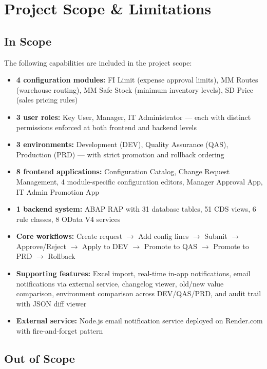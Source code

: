 \documentclass[12pt,a4paper]{report}
\begin{document}
\section{Project Scope \& Limitations}

\subsection{In Scope}

The following capabilities are included in the project scope:

\begin{itemize}[leftmargin=2em]
  \item \textbf{4 configuration modules:} FI Limit (expense approval limits), MM Routes (warehouse routing), MM Safe Stock (minimum inventory levels), SD Price (sales pricing rules)
  \item \textbf{3 user roles:} Key User, Manager, IT Administrator --- each with distinct permissions enforced at both frontend and backend levels
  \item \textbf{3 environments:} Development (DEV), Quality Assurance (QAS), Production (PRD) --- with strict promotion and rollback ordering
  \item \textbf{8 frontend applications:} Configuration Catalog, Change Request Management, 4 module-specific configuration editors, Manager Approval App, IT Admin Promotion App
  \item \textbf{1 backend system:} ABAP RAP with 31 database tables, 51 CDS views, 6 rule classes, 8 OData V4 services
  \item \textbf{Core workflows:} Create request $\rightarrow$ Add config lines $\rightarrow$ Submit $\rightarrow$ Approve/Reject $\rightarrow$ Apply to DEV $\rightarrow$ Promote to QAS $\rightarrow$ Promote to PRD $\rightarrow$ Rollback
  \item \textbf{Supporting features:} Excel import, real-time in-app notifications, email notifications via external service, changelog viewer, old/new value comparison, environment comparison across DEV/QAS/PRD, and audit trail with JSON diff viewer
  \item \textbf{External service:} Node.js email notification service deployed on Render.com with fire-and-forget pattern
\end{itemize}

\subsection{Out of Scope}
\end{document}
